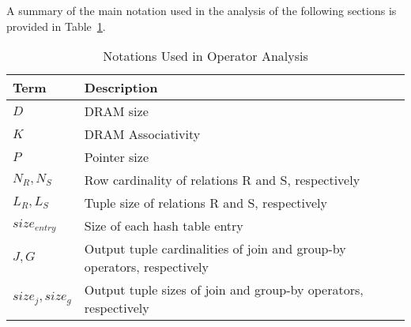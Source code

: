 A summary of the main notation used in the analysis of the following
sections is provided in Table~\ref{tab:notations}.

\begin{table}[t]
\centering
\caption{Notations Used in Operator Analysis}
\label{tab:notations}
\begin{small}
\begin{tabular}{p{2cm}p{9cm}}
\toprule  
\textbf{Term} & \textbf{Description}\\ 
\midrule
\textbf{$D$} & DRAM size\\
\textbf{$K$} & DRAM Associativity\\
\textbf{$P$} & Pointer size\\
\textbf{$N_R, N_S$} & Row cardinality of relations R and S, respectively\\
\textbf{$L_R, L_S$} & Tuple size of relations R and S, respectively\\
\textbf{$size_{entry}$} & Size of each hash table entry\\
\textbf{$J,G$} & Output tuple cardinalities of join and group-by operators, respectively\\
\textbf{$size_{j},size_{g}$} & Output tuple sizes of join and group-by operators, respectively\\
\bottomrule
\end{tabular}
\end{small}
\end{table}
